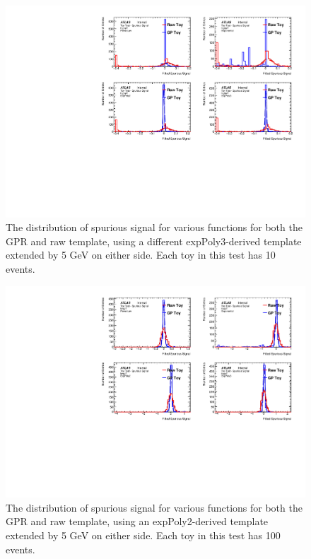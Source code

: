 \begin{figure} 
\begin{center}
  \includegraphics[width=\textwidth]{figures/background/gpr/validation/padded/ToyTest_FitSigVals_highpT_10_noSig}   
\caption{The distribution of spurious signal for various functions for both the GPR and raw template, using a different expPoly3-derived template extended by 5 GeV on either side. Each toy in this test has 10 events.}
\label{fig:padded_highpt_10_noSig}
\end{center}
\end{figure}

\begin{figure} 
\begin{center}
  \includegraphics[width=\textwidth]{figures/background/gpr/validation/padded/ToyTest_FitSigVals_lowpT_100_noSig}   
\caption{The distribution of spurious signal for various functions for both the GPR and raw template, using an expPoly2-derived template extended by 5 GeV on either side. Each toy in this test has 100 events.}
\label{fig:padded_lowpt_100_noSig}
\end{center}
\end{figure}

